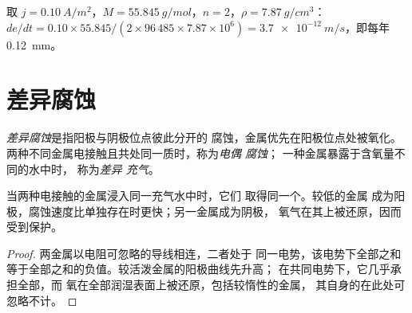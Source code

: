 \begin{example}\label{ex:b2:corrosion:rate}
取 $j = \qty{0.10}{A/m^2}$，$M = \qty{55.845}{g/mol}$，$n = 2$，$\rho =
\qty{7.87}{g/cm^3}$：$de/dt = 0.10 \times 55.845/(2 \times 96\,485 \times 7.87
\times 10^6) = \qty{3.7e-12}{m/s}$，即每年 \qty{0.12}{mm}。
\end{example}

\section{差异腐蚀}

\begin{definition}[差异腐蚀]\label{def:b2:corrosion:differential}
\emph{差异腐蚀}是指阳极与阴极位点彼此分开的
腐蚀，金属优先在阳极位点处被氧化。
两种不同金属电接触且共处同一质时，称为\emph{电偶
腐蚀}；
一种金属暴露于含氧量不同的水中时，
称为\emph{差异
充气}。
\end{definition}

\begin{proposition}[两种金属接触]\label{prop:b2:corrosion:galvanic}
当两种电接触的金属浸入同一充气水中时，它们
取得同一个。较低的金属
成为阳极，腐蚀速度比单独存在时更快；另一金属成为阴极，
氧气在其上被还原，因而受到保护。
\end{proposition}

\begin{proof}
两金属以电阻可忽略的导线相连，二者处于
同一电势，该电势下全部之和
等于全部之和的负值。较活泼金属的阳极曲线先升高；
在共同电势下，它几乎承担全部，而
氧在全部润湿表面上被还原，包括较惰性的金属，
其自身的在此处可忽略不计。
\end{proof}

